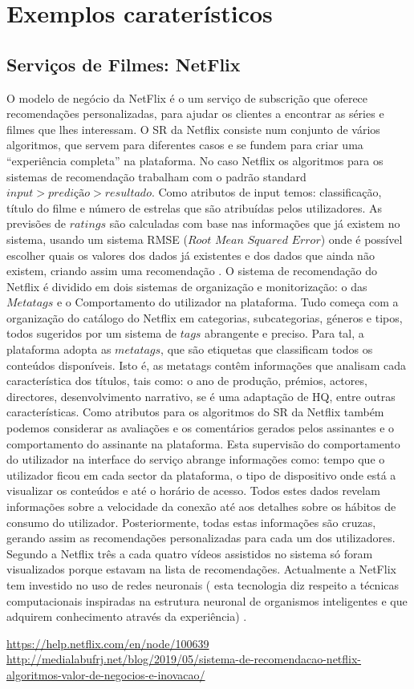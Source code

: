 \section{Exemplos caraterísticos}
\subsection{ Serviços de Filmes: NetFlix}
O modelo de negócio da NetFlix é o um serviço de subscrição que oferece recomendações personalizadas, para ajudar os clientes a encontrar as séries e filmes que lhes interessam.
O SR da Netflix consiste num conjunto de vários algoritmos, que servem para diferentes casos e se fundem para criar uma “experiência completa” na plataforma.
No caso Netflix os algoritmos para os sistemas de recomendação trabalham com o padrão standard $input> predição> resultado$. Como atributos de input temos: classificação, título do filme e número de estrelas que são atribuídas pelos utilizadores. As previsões de $ratings$ são calculadas com base nas informações que já existem no sistema, usando um sistema RMSE ($Root$ $Mean$ $Squared$ $Error$) onde é possível escolher quais os valores dos dados já existentes e dos dados que ainda não existem, criando assim uma recomendação \cite{net}.
O sistema de recomendação do Netflix é dividido em dois sistemas de organização e monitorização: o das $Metatags$ e o Comportamento do utilizador na plataforma. 
Tudo começa com a organização do catálogo do Netflix em categorias, subcategorias, géneros e tipos, todos sugeridos por um sistema de $tags$ abrangente e preciso. Para tal, a plataforma adopta as $metatags$, que são etiquetas que classificam todos os conteúdos disponíveis. Isto é, as metatags contêm informações que analisam cada característica dos títulos, tais como: o ano de produção, prémios, actores, directores, desenvolvimento narrativo, se é uma adaptação de HQ, entre outras características. 
Como atributos para os algoritmos do SR da Netflix também podemos considerar as avaliações e os comentários gerados pelos assinantes e o comportamento do assinante na plataforma. Esta supervisão do comportamento do utilizador na interface do serviço abrange informações como: tempo que o utilizador ficou em cada sector da plataforma, o tipo de dispositivo onde está a visualizar os conteúdos e até o horário de acesso. Todos estes dados revelam informações sobre a velocidade da conexão até aos detalhes sobre os hábitos de consumo do utilizador.
Posteriormente, todas estas informações são cruzas, gerando assim as recomendações personalizadas para cada um dos utilizadores. Segundo a Netflix três a cada quatro vídeos assistidos no sistema só foram visualizados porque estavam na lista de recomendações. Actualmente a NetFlix tem
investido no uso de redes neuronais ( esta tecnologia diz respeito a
técnicas computacionais inspiradas na estrutura neuronal de organismos inteligentes e que adquirem conhecimento através da experiência) \cite{net1}.









\begin{thebibliography}{8}



 \url{https://help.netflix.com/en/node/100639}
 \url{http://medialabufrj.net/blog/2019/05/sistema-de-recomendacao-netflix-algoritmos-valor-de-negocios-e-inovacao/}


\end{thebibliography}

